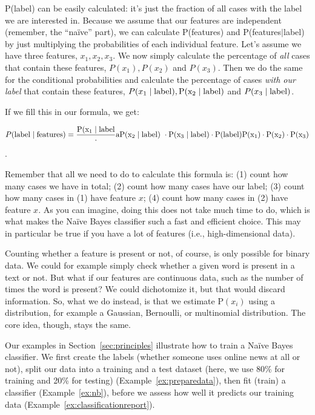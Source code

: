 P(label) can be easily calculated: it's just the fraction of all
cases with the label we are interested in.  Because we assume that our
features are independent (remember, the ``na\"ive'' part), we can
calculate P(features) and P(features$\mid$label) by just
multiplying the probabilities of each individual feature.  Let's
assume we have three features, $x_1, x_2, x_3$.  We now simply
calculate the percentage of \emph{all} cases that contain these
features, ${P}(x_1), {P}(x_2)$ and ${P}(x_3)$.  Then we do the same for the
conditional probabilities and calculate the percentage of cases
\emph{with our label} that contain these features, ${P}(x_1\mid \rm{label}),
{P}(x_2\mid \rm{label})$ and ${P}(x_3\mid \rm{label})$.

If we fill this in our formula, we get:


$$ P(\rm{label} \mid \rm{features}) = \frac{{P}(x_1 \mid \rm{label}} \cdot {a{P}(x_2 \mid \rm{label})\ \cdot {P}(x_3 \mid \rm{label}) \cdot {P}(\rm{label})}{{P}(x_1) \cdot {P}(x_2) \cdot P(x_3)}$$.

Remember that all we need to do to calculate this formula is: (1)
count how many cases we have in total; (2) count how many cases
have our label; (3) count how many cases in (1) have feature $x$;
(4) count  how many cases in (2) have feature $x$.  As you can
imagine, doing this does not take much time to do, which is what makes the
Na\"ive Bayes classifier such a fast and efficient choice.  This may
in particular be true if you have a lot of features (i.e.,
high-dimensional data).

Counting whether a feature is present or not, of course, is only
possible for binary data. We could for example simply check whether a
given word is present in a text or not.  But what if our features are
continuous data, such as the number of times the word is present?  We
could dichotomize it, but that would discard information.  So, what
we do instead, is that we estimate P$(x_i)$ using a distribution, for
example a Gaussian, Bernoulli, or multinomial distribution. The core
idea, though, stays the same.

Our examples in Section~\ref{sec:principles} illustrate how to train a Na\"ive Bayes classifier.
We first create the labels (whether someone uses online news at all or
not), split our data into a training and a test dataset (here, we use
80\% for training and 20\% for testing) (Example~\ref{ex:preparedata}), then
fit (train) a classifier (Example~\ref{ex:nb}), before we assess how well it
predicts our training data (Example~\ref{ex:classificationreport}).

